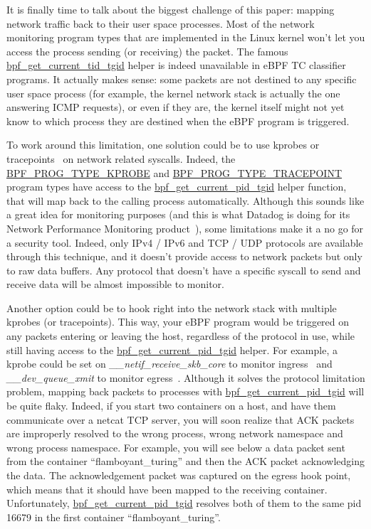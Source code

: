 It is finally time to talk about the biggest challenge of this paper: mapping network traffic back to their user space processes. Most of the network monitoring program types that are implemented in the Linux kernel won’t let you access the process sending (or receiving) the packet. The famous \url{bpf_get_current_tid_tgid} helper is indeed unavailable in eBPF TC classifier programs. It actually makes sense: some packets are not destined to any specific user space process (for example, the kernel network stack is actually the one answering ICMP requests), or even if they are, the kernel itself might not yet know to which process they are destined when the eBPF program is triggered.

To work around this limitation, one solution could be to use kprobes or tracepoints~\cite{ProcessLevelNetworkSecurityMonitoring:KernelProbesDoc} on network related syscalls. Indeed, the \url{BPF_PROG_TYPE_KPROBE} and \url{BPF_PROG_TYPE_TRACEPOINT} program types have access to the \url{bpf_get_current_pid_tgid} helper function, that will map back to the calling process automatically. Although this sounds like a great idea for monitoring purposes (and this is what Datadog is doing for its Network Performance Monitoring product~\cite{ProcessLevelNetworkSecurityMonitoring:MichaelGerstenhaber}), some limitations make it a no go for a security tool. Indeed, only IPv4 / IPv6 and TCP / UDP protocols are available through this technique, and it doesn’t provide access to network packets but only to raw data buffers. Any protocol that doesn’t have a specific syscall to send and receive data will be almost impossible to monitor.

Another option could be to hook right into the network stack with multiple kprobes (or tracepoints). This way, your eBPF program would be triggered on any packets entering or leaving the host, regardless of the protocol in use, while still having access to the \url{bpf_get_current_pid_tgid} helper. For example, a kprobe could be set on \emph{\_\_netif\_receive\_skb\_core} to monitor ingress~\cite{ProcessLevelNetworkSecurityMonitoring:PackagecloudReceiving} and \emph{\_\_dev\_queue\_xmit} to monitor egress~\cite{ProcessLevelNetworkSecurityMonitoring:PackagecloudSending}. Although it solves the protocol limitation problem, mapping back packets to processes with \url{bpf_get_current_pid_tgid} will be quite flaky. Indeed, if you start two containers on a host, and have them communicate over a netcat TCP server, you will soon realize that ACK packets are improperly resolved to the wrong process, wrong network namespace and wrong process namespace. For example, you will see below a data packet sent from the container “flamboyant\_turing” and then the ACK packet acknowledging the data. The acknowledgement packet was captured on the egress hook point, which means that it should have been mapped to the receiving container. Unfortunately, \url{bpf_get_current_pid_tgid} resolves both of them to the same pid 16679 in the first container “flamboyant\_turing”.


